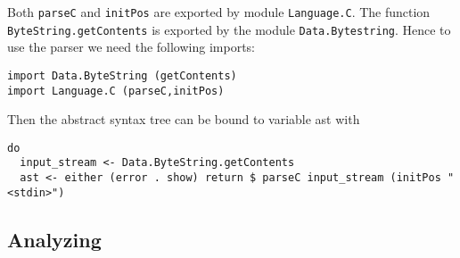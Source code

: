 \documentclass[a4paper]{report}
\newcommand{\code}[1]{\textnormal{\texttt{#1}}}
\begin{document}
Both \code{parseC} and \code{initPos} are exported by module \code{Language.C}. The function \code{ByteString.getContents}
is exported by the module \code{Data.Bytestring}. Hence to use the parser we need the following imports:
\begin{verbatim}
import Data.ByteString (getContents)
import Language.C (parseC,initPos)
\end{verbatim}

Then the abstract syntax tree can be bound to variable ast with
\begin{verbatim}
do
  input_stream <- Data.ByteString.getContents
  ast <- either (error . show) return $ parseC input_stream (initPos "<stdin>")
\end{verbatim}

\subsection{Analyzing}
\end{document}
